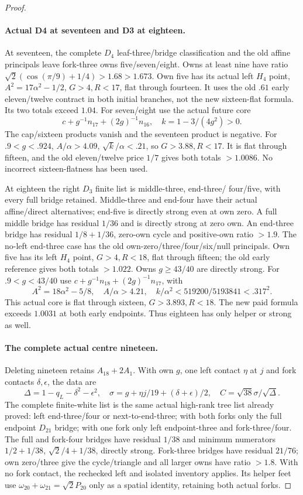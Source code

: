 \begin{proof}
\paragraph{Actual D4 at seventeen and D3 at eighteen.}
At seventeen, the complete $D_4$ leaf-three/bridge classification
and the old affine principals leave fork-three owns five/seven/eight.
Owns at least nine have ratio
$\sqrt2(\cos(\pi/9)+1/4)>1.68>1.673$.
Own five has its actual left $H_4$ point,
$A^2=17\alpha^2-1/2$, $G>4,R<17$, flat through fourteen.
It uses the old $.61$ early eleven/twelve contract in both initial
branches, not the new sixteen-flat formula. Its two totals exceed
$1.04$. For seven/eight use the actual future core
\[
 c+g^{-1}n_{17}+(2g)^{-1}n_{16},\quad k=1-3/(4g^2)>0.
\]
The cap/sixteen products vanish and the seventeen product is negative.
For $.9<g<.924$, $A/\alpha>4.09$, $\sqrt{k}/\alpha<.21$,
so $G>3.88,R<17$. It is flat through fifteen, and the old
eleven/twelve price $1/7$ gives both totals $>1.0086$.
No incorrect sixteen-flatness has been used.

At eighteen the right $D_3$ finite list is middle-three, end-three/
four/five, with every full bridge retained. Middle-three and end-four
have their actual affine/direct alternatives; end-five is directly
strong even at own zero. A full middle bridge has residual $1/36$
and is directly strong at zero own. An end-three bridge has residual
$1/8+1/36$, zero-own cycle and positive-own ratio $>1.9$.
The no-left end-three case has the old own-zero/three/four/six/null
principals. Own five has its left $H_4$ point, $G>4,R<18$,
flat through fifteen; the old early reference gives both totals
$>1.022$. Owns $g\ge43/40$ are directly strong.
For $.9<g<43/40$ use
$c+g^{-1}n_{18}+(2g)^{-1}n_{17}$, with
\[
 A^2=18\alpha^2-5/8,\quad
 A/\alpha>4.21,\quad
 k/\alpha^2<519200/5193841<.317^2.
\]
This actual core is flat through sixteen, $G>3.893,R<18$.
The new paid formula exceeds $1.0031$ at both early endpoints.
Thus eighteen has only helper or strong as well.

\paragraph{The complete actual centre nineteen.}
Deleting nineteen retains $A_{18}+2A_1$. With own $g$, one left
contact $\eta$ at $j$ and fork contacts $\delta,\epsilon$, the
data are
\[
 \Delta=1-q_L-\delta^2-\epsilon^2,\quad
 \sigma=g+\eta j/19+(\delta+\epsilon)/2,\quad
 C=\sqrt{38}\sigma/\sqrt\Delta.
\]
The complete finite-white list is the same actual high-rank tree
list already proved: left end-three/four or next-to-end-three;
with both forks only the full endpoint $D_{21}$ bridge; with one
fork only left endpoint-three and fork-three/four.
The full and fork-four bridges have residual $1/38$ and minimum
numerators $1/2+1/38$, $\sqrt2/4+1/38$, directly strong.
Fork-three bridges have residual $21/76$; own zero/three give
the cycle/triangle and all larger owns have ratio $>1.8$.
With no fork contact, the rechecked left and isolated inventory
applies. Its helper feet use $\omega_{20}+\omega_{21}=\sqrt2P_{20}$
only as a spatial identity, retaining both actual forks.


\end{proof}
